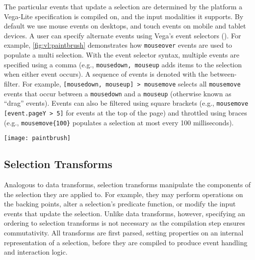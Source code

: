 The particular events that update a selection are determined by the platform a
Vega-Lite specification is compiled on, and the input modalities it supports. By
default we use mouse events on desktops, and touch events on mobile and tablet
devices. A user can specify alternate events using Vega's event selectors
(). For example, \cref{fig:vl:paintbrush} demonstrates how
\texttt{mouseover} events are used to populate a multi selection. With the event
selector syntax, multiple events are specified using a comma (e.g.,
\texttt{mousedown, mouseup} adds items to the selection when either event
occurs). A sequence of events is denoted with the between-filter. For example,
\texttt{[mousedown, mouseup] > mousemove} selects all \texttt{mousemove} events
that occur between a \texttt{mousedown} and a \texttt{mouseup} (otherwise known
as ``drag'' events). Events can also be filtered using square brackets (e.g.,
\texttt{mousemove [event.pageY > 5]} for events at the top of the page) and
throttled using braces (e.g., \texttt{mousemove\{100\}} populates a selection at
most every 100 milliseconds).

\begin{figure*}[h!]
  \centering
  \texttt{[image: paintbrush]}
  \caption{Specifying a custom event trigger for a \emph{multi} selection: the
  first point is selected on \texttt{mouseover} and subsequent points when the
  shift key is pressed.}
  \label{fig:vl:paintbrush}
\end{figure*}

\vspace{-10pt}

\subsection{Selection Transforms}

\vspace{-7pt}

Analogous to data transforms, selection transforms manipulate the components of
the selection they are applied to. For example, they may perform operations on
the backing points, alter a selection's predicate function, or modify the input
events that update the selection. Unlike data transforms, however, specifying an
ordering to selection transforms is not necessary as the compilation step
ensures commutativity. All transforms are first parsed, setting properties on an
internal representation of a selection, before they are compiled to produce
event handling and interaction logic.

